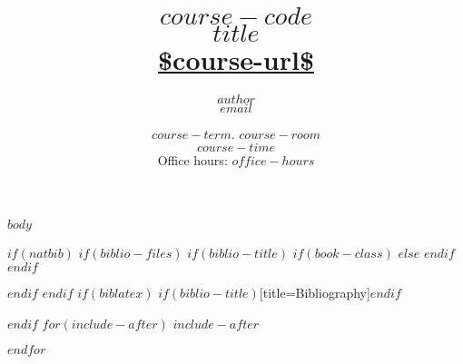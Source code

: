 \documentclass[10pt,letterpaper,article,oneside]{memoir}
\begin{document}
\title{\LARGE {\normalsize \textsc{$course-code$}\\} \HUGE $title$ \\
  \Large\url{$course-url$}}     
\author{\Large $author$\\ \small\texttt{\noindent $email$}}
\date{$course-term$. $course-room$ \\ $course-time$ \\ \small Office hours: $office-hours$} 

\maketitle

$body$

$if(natbib)$
$if(biblio-files)$
$if(biblio-title)$
$if(book-class)$
\renewcommand\bibname{Bibliography}
$else$
\renewcommand\refname{References}
$endif$
$endif$


$endif$
$endif$
$if(biblatex)$
\SingleSpacing
\printbibliography$if(biblio-title)$[title=Bibliography]$endif$

$endif$
$for(include-after)$
$include-after$

$endfor$
\end{document}

